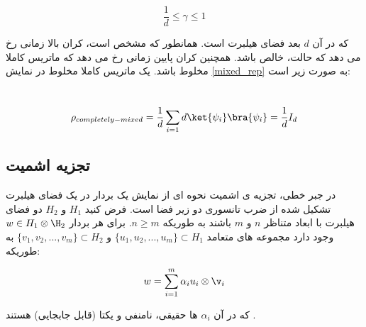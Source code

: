 \begin{equation}
    \frac{1}{d} \leq \gamma \leq 1
\end{equation}

که در آن
$d$
بعد فضای هیلبرت است. همانطور که مشخص است، کران بالا زمانی رخ می دهد که حالت، خالص باشد. همچنین کران پایین زمانی رخ می دهد که ماتریس کاملا مخلوط باشد.
یک ماتریس کاملا مخلوط در نمایش
\ref{mixed_rep}
به صورت زیر است:

‍\begin{equation}
    \rho_{completely-mixed} = \frac{1}{d} \sum_{i=1}{d} \ket{\psi_i} \bra{\psi_i} = \frac{1}{d} I_d
\end{equation}


\subsection{تجزیه اشمیت}

در جبر خطی، تجزیه ی اشمیت نحوه ای از نمایش یک بردار در یک فضای هیلبرت تشکیل شده از ضرب تانسوری دو زیر فضا است. فرض کنید
$H_1$
و
$H_2$
دو فضای هیلبرت با ابعاد متناظر
$n$
و
$m$
باشند به طوریکه
$n \geq m$.
برای هر بردار
$w \in H_1 \otimes \H_2$
وجود دارد مجموعه های متعامد
$\{ u_1, u_2, ..., u_m\} \subset H_1$
و
$\{ v_1, v_2, ..., v_m\} \subset H_2$
به طوریکه:

\begin{equation}
    w = \sum_{i=1}^{m}{\alpha_i u_i \otimes \v_i}
\end{equation}

که در آن
$\alpha_i$
ها حقیقی، نامنفی و یکتا (قابل جابجایی) هستند
\cite{hoffman}.

